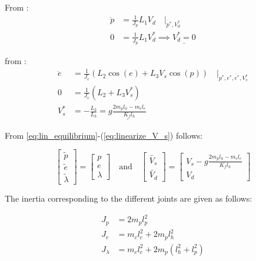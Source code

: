 From :
\begin{subequations}\label{eq:linearize_V_d}
    \begin{aligned}
       \ddot{p} &= \frac{1}{J_{p}} L_{1} V_{d} \quad |_{\ddot{p^*},V_{d}^*} \\
       0 &= \frac{1}{J_{p}} L_{1} V_{d}^* \implies \underline{V_{d}^* = 0}
    \end{aligned}
\end{subequations}



from :
\begin{subequations}\label{eq:linearize_V_s}
    \begin{aligned}
       \ddot{e} &= \frac{1}{J_{e}} ( L_{2} \cos(e) + L_{3} V_{s} \cos(p)) 
       \quad |_{p^*,e^*,\ddot{e^*},V_{s}^*}  \\
       0 &= \frac{1}{J_{e}} (L_{2} + L_{3} V_{s}^*) \\
       V_{s}^* &= -\frac{L_{2}}{L_{3}} 
       = \underline{g \frac{2 m_{p} l_{h} - m_{c} l_{c}}{K_{f} l_{h}}} \label{const:V_s_star}
    \end{aligned}
\end{subequations}

From \cref{eq:lin_equilibrium}-(\ref{eq:linearize_V_s}) follows:

\begin{equation}\label{eq:transformed}
    \begin{bmatrix} \tilde{p} \\ \tilde{e} \\ \tilde{\lambda} \end{bmatrix}
    =
    \begin{bmatrix} p \\ e \\ \lambda \end{bmatrix}
    \quad \textrm{and} \quad
    \begin{bmatrix} \tilde{V_{s}} \\ \tilde{V_{d}} \end{bmatrix}
    =
    \begin{bmatrix} V_{s} - g \frac{2 m_{p} l_{h} - m_{c} l_{c}}{K_{f} l_{h}} \\ V_{d} \end{bmatrix}
\end{equation}
    
The inertia corresponding to the different joints are given as follows:

\begin{subequations}\label{eq:inertia}
    \begin{aligned}
        J_{p} &= 2 m_{p} l_{p}^2
        \label{eq:inertia_pitch} \\
        J_{e} &= m_{c} l_{c}^2 +  2 m_{p} l_{h}^2
        \label{eq:inertia_elev} \\
        J_{\lambda} &= m_{c} l_{c}^2 + 2 m_{p} (l_{h}^2 + l_{p}^2)
        \label{eq:inertia_travel}
    \end{aligned}
\end{subequations}

